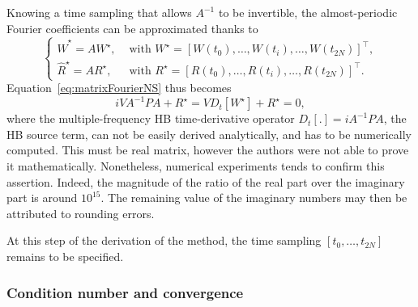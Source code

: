Knowing a time sampling that allows $A^{-1}$ to be invertible,
the almost-periodic Fourier coefficients can be approximated thanks to
\begin{equation}
  \begin{cases}
    \widehat{W}^{\star} = A W^{\star}, & \text{ with } W^{\star} = \left[ W\left( t_0
      \right),\ldots,W\left( t_i \right),\ldots,W\left( t_{2N} \right)
    \right]^\top,\\
    \widehat{R}^{\star} = A R^{\star}, & \text{ with } R^{\star} = \left[ R\left( t_0
      \right),\ldots,R\left( t_i \right),\ldots,R\left( t_{2N} \right)
    \right]^\top.
  \end{cases}
   \label{eq:idftW}
\end{equation}
Equation~\eqref{eq:matrixFourierNS} thus becomes
\begin{equation}
   iVA^{-1}PA + R^{\star} = 
   V D_t [ W^{\star}] + R^{\star} = 0,
   \label{eq:matrixFourierNS_2}
\end{equation}
where the multiple-frequency HB time-derivative operator $D_t[.] = i
A^{-1} P A$, the HB source term, can not be easily derived
analytically, and has to be numerically computed. This must be 
real matrix, however the authors were not able to prove it mathematically.
Nonetheless, numerical experiments tends to confirm this assertion. Indeed, 
the magnitude of the ratio of the real part over the imaginary part is around $10^{15}$.
The remaining value of the imaginary numbers may then be attributed to rounding errors.
% 

At this step of the derivation of the method, the time sampling $[t_0,
\ldots, t_{2N}]$ remains to be specified.

\subsubsection{Condition number and convergence}
\label{sec:condition_number}

